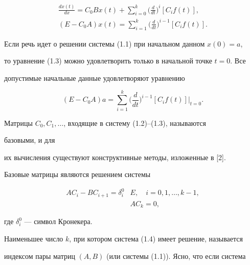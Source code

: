 \begin{gather} 


\frac{dx(t)}{dx}=C_0Bx(t)+\sum^k_{i=0} 


\bigg(\frac{d}{dt} \bigg)^i[C_i f(t)],\\ 


(E-C_0A)x(t)=\sum^k_{i=1}\bigg(\frac{d}{dt} \bigg)^{i-1} 


[C_i f(t)]. 


\end{gather} 


Если речь идет о решении системы (1.1) при начальном данном $x(0)=a$, 


то уравнение (1.3) можно удовлетворить только в начальной точке $t=0$. Все 


допустимые начальные данные удовлетворяют уравнению 


$$ 


(E-C_0A)a=\sum^k_{i=1}\bigg(\frac{d}{dt} \bigg)^{i-1} 


[C_i f(t)]\big|_{t=0}. 


$$ 


 


Матрицы $C_0,C_1,\dotsc$, входящие в систему (1.2)--(1.3), называются 


базовыми, и для 


их вычисления существуют конструктивные методы, изложенные в [2]. 


 


Базовые матрицы являются решением системы 


\begin{equation} 


\begin{split} 


AC_i-BC_{i+1}=\delta^0_i &E,\quad i=0,1,\dotsc,k-1,\\ 


&AC_k=0, 


\end{split} 


\end{equation} 


где $\delta^0_i$ --- символ Кронекера. 


 


Наименьшее число $k$, при котором система (1.4) имеет решение, называется 


индексом пары матриц $(A,B)$ (или системы (1.1)). Ясно, что если система 


